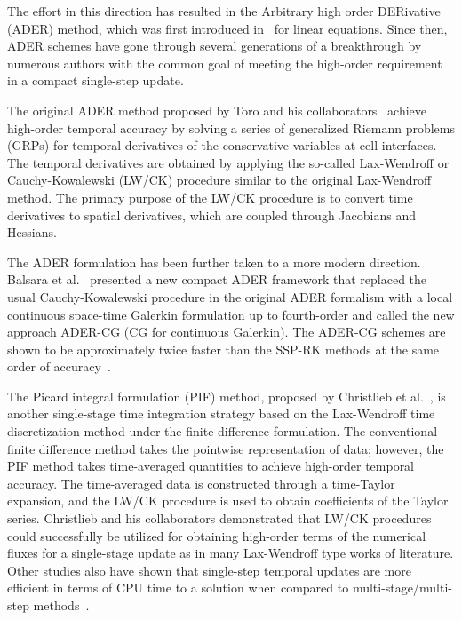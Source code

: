 The effort in this direction has resulted in the Arbitrary high order DERivative (ADER) method,
which was first introduced in~\cite{toro2001towards} for linear equations.
Since then, ADER schemes have gone through several generations of a breakthrough
by numerous authors with the common goal of meeting the high-order requirement
in a compact single-step update.

The original ADER method proposed by Toro and his collaborators~\cite{toro2001towards,titarev2002ader,titarev2005ader}
achieve high-order temporal accuracy by solving a series of generalized Riemann problems (GRPs)
for temporal derivatives of the conservative variables at cell interfaces.
The temporal derivatives are obtained by applying
the so-called Lax-Wendroff or Cauchy-Kowalewski (LW/CK) procedure
similar to the original Lax-Wendroff method.
The primary purpose of the LW/CK procedure
is to convert time derivatives to spatial derivatives,
which are coupled through Jacobians and Hessians.

The ADER formulation has been further taken to a more modern direction.
Balsara et al.~\cite{balsara2009efficient} presented a new compact ADER framework
that replaced the usual Cauchy-Kowalewski procedure in the original ADER formalism
with a local continuous space-time Galerkin formulation up to fourth-order
and called the new approach ADER-CG (CG for continuous Galerkin).
The ADER-CG schemes are shown to be approximately
twice faster than the SSP-RK methods at the same order of accuracy~\cite{balsara2013efficient}.

The Picard integral formulation (PIF) method, proposed by Christlieb et al.~\cite{christlieb2015picard},
is another single-stage time integration strategy based on the Lax-Wendroff
time discretization method under the finite difference formulation.
The conventional finite difference method takes the pointwise representation of data; however,
the PIF method takes time-averaged quantities to achieve high-order temporal accuracy.
The time-averaged data is constructed through a time-Taylor expansion,
and the LW/CK procedure is used to obtain coefficients of the Taylor series.
Christlieb and his collaborators demonstrated that LW/CK procedures
could successfully be utilized for obtaining high-order terms of the numerical fluxes
for a single-stage update as in many Lax-Wendroff type works of literature.
Other studies also have shown that single-step temporal updates are more efficient
in terms of CPU time to a solution when compared to
multi-stage/multi-step methods~\cite{balsara2013efficient,lee2017piecewise,lee2021single}.

